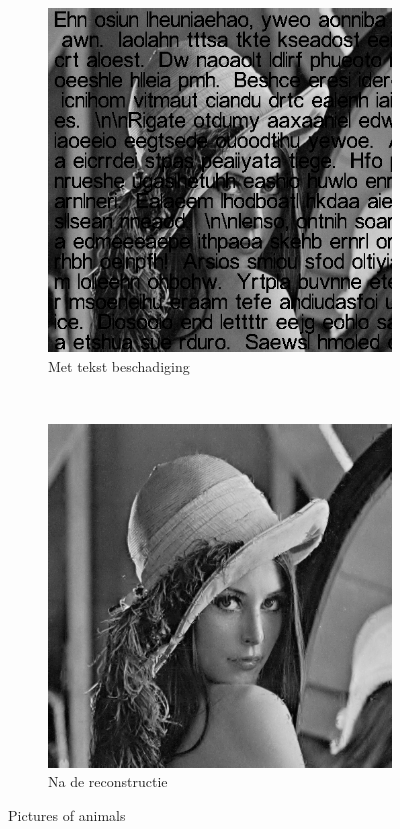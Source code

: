 \begin{figure}
    \centering
    \begin{subfigure}[b]{0.45\textwidth}
        \includegraphics[width=\textwidth]{../src/inpainting/lena_broke}
        \caption{Met tekst beschadiging}
        \label{fig:tiger}
    \end{subfigure}
    ~ %
    \begin{subfigure}[b]{0.45\textwidth}
        \includegraphics[width=\textwidth]{../src/inpainting/lena_fixed}
        \caption{Na de reconstructie}
        \label{fig:mouse}
    \end{subfigure}
    \caption{Pictures of animals}\label{fig:animals}
\end{figure}



